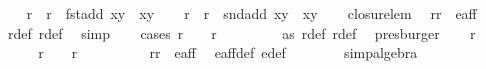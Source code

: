 \begin{isabellebody}
\ \ \isamarkupfalse%
\ r{}\ \ {\isachardoublequoteopen}r{}\ {\isacharequal}\ fst{\isacharparenleft}add\ {\isacharparenleft}x{\isacharcomma}y{\isacharparenright}\ {\isacharparenleft}{\isasymtau}\ {\isacharparenleft}x{\isacharprime}{\isacharcomma}y{\isacharprime}{\isacharparenright}{\isacharparenright}{\isacharparenright}{\isachardoublequoteclose}\isanewline
\ \ \isamarkupfalse%
\ r{}\ \ {\isachardoublequoteopen}r{}\ {\isacharequal}\ snd{\isacharparenleft}add\ {\isacharparenleft}x{\isacharcomma}y{\isacharparenright}\ {\isacharparenleft}{\isasymtau}\ {\isacharparenleft}x{\isacharprime}{\isacharcomma}y{\isacharprime}{\isacharparenright}{\isacharparenright}{\isacharparenright}{\isachardoublequoteclose}\isanewline
\ \ \isamarkupfalse%
\ closure{\isacharunderscore}lem\ \isamarkupfalse%
\ {\isachardoublequoteopen}{\isacharparenleft}r{}{\isacharcomma}r{}{\isacharparenright}\ {\isasymin}\ e{\isacharunderscore}aff{\isachardoublequoteclose}\ \isamarkupfalse%
\ r{}{\isacharunderscore}def\ r{}{\isacharunderscore}def\ \isamarkupfalse%
\ simp\isanewline
\ \ \isamarkupfalse%
\ cases{\isacharcolon}\ {\isachardoublequoteopen}r{}\ {\isacharequal}\ {}\ {\isasymor}\ r{}\ {\isacharequal}\ {}{\isachardoublequoteclose}\ \isanewline
\ \ \ \ \isamarkupfalse%
\ as\ r{}{\isacharunderscore}def\ r{}{\isacharunderscore}def\ \isamarkupfalse%
\ presburger\isanewline
\ \ \isacommand{{\isacharbraceleft}}\isamarkupfalse%
\isamarkupfalse%
\ {\isachardoublequoteopen}r{}\ {\isacharequal}\ {}{\isachardoublequoteclose}\ \isanewline
\ \ \isamarkupfalse%
\ \isamarkupfalse%
\ {\isachardoublequoteopen}r{}\ {\isacharequal}\ {}\ {\isasymor}\ r{}\ {\isacharequal}\ {\isacharminus}{}{\isachardoublequoteclose}\isanewline
\ \ \ \ \ \ \isamarkupfalse%
\ {\isacartoucheopen}{\isacharparenleft}r{}{\isacharcomma}r{}{\isacharparenright}\ {\isasymin}\ e{\isacharunderscore}aff{\isacartoucheclose}\ \isamarkupfalse%
\ e{\isacharunderscore}aff{\isacharunderscore}def\ e{\isacharprime}{\isacharunderscore}def\ \isanewline
\ \ \ \ \ \ \isamarkupfalse%
{\isacharparenleft}simp{\isacharcomma}algebra{\isacharparenright}\isacommand{{\isacharbraceright}}\isamarkupfalse%

\end{isabellebody}
